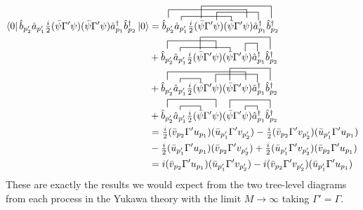 \documentclass[12pt]{article}
\newcommand{\bra}[1]{\left| #1 \right>}
\newcommand{\ket}[1]{\left| #1 \right>}
\renewcommand{\bra}[1]{\left< #1 \right|}
\renewcommand{\a}{\hat{a}}
\newcommand{\adag}{\hat{a}^\dagger}
\renewcommand{\b}{\hat{b}}
\newcommand{\bdag}{\hat{b}^\dagger}
\begin{document}
\begin{align*}
\bra{0} \b_{p_2'} \a_{p_1'} \tfrac{i}{2} ( \bar{\psi} \Gamma' \psi) (\bar{\psi} \Gamma' \psi)\adag_{p_1} \bdag_{p_2} \ket{0} 
& =
\contraction[2ex]{}{\b_{p_2'}}{ \a_{p_1'} \tfrac{i}{2} ( \bar{\psi} \Gamma' \psi) (\bar{\psi} \Gamma'}{ \psi}
\contraction{\b_{p_2'} }{ \a_{p_1'} }{ \tfrac{i}{2} ( \bar{\psi} \Gamma' \psi) (} {\bar{\psi}} 
\contraction[2ex]{\b_{p_2'} \a_{p_1'} \tfrac{i}{2} ( \bar{\psi} \Gamma'}{ \psi}{) (\bar{\psi} \Gamma' \psi)}{\adag}
\contraction[3ex]{\b_{p_2'} \a_{p_1'} \tfrac{i}{2} ( }{ \bar{\psi} }{ \Gamma' \psi) ( \bar{\psi}  \Gamma' \psi )\adag_{p_1} }{ \bdag}
\b_{p_2'} \a_{p_1'} \tfrac{i}{2} ( \bar{\psi} \Gamma' \psi) (\bar{\psi} \Gamma' \psi)\adag_{p_1} \bdag_{p_2}
\\
& +  
\contraction[2ex]{}{\b_{p_2'}}{ \a_{p_1'} \tfrac{i}{2} ( \bar{\psi} \Gamma'}{ \psi}
\contraction{\b_{p_2'} }{ \a_{p_1'} }{ \tfrac{i}{2} ( \bar{\psi} \Gamma' \psi) (} {\bar{\psi}} 
\contraction[2ex]{\b_{p_2'} \a_{p_1'} \tfrac{i}{2} ( \bar{\psi} \Gamma' \psi) (\bar{\psi} \Gamma'}{ \psi}{)}{\adag}
\contraction[3ex]{\b_{p_2'} \a_{p_1'} \tfrac{i}{2} ( }{ \bar{\psi} }{ \Gamma' \psi) ( \bar{\psi}  \Gamma' \psi )\adag_{p_1} }{ \bdag}
\b_{p_2'} \a_{p_1'} \tfrac{i}{2} ( \bar{\psi} \Gamma' \psi) (\bar{\psi} \Gamma' \psi)\adag_{p_1} \bdag_{p_2}
\\
& + 
\contraction[2ex]{}{\b_{p_2'}}{ \a_{p_1'} \tfrac{i}{2} ( \bar{\psi} \Gamma' \psi) (\bar{\psi} \Gamma'}{ \psi}
\contraction{\b_{p_2'} }{ \a_{p_1'} }{ \tfrac{i}{2} (}{ \bar{\psi} } 
\contraction[2ex]{\b_{p_2'} \a_{p_1'} \tfrac{i}{2} ( \bar{\psi} \Gamma'}{ \psi}{) (\bar{\psi} \Gamma' \psi)}{\adag}
\contraction[3ex]{\b_{p_2'} \a_{p_1'} \tfrac{i}{2} ( \bar{\psi} \Gamma' \psi) (}{ \bar{\psi} }{ \Gamma' \psi )\adag_{p_1} }{ \bdag}
\b_{p_2'} \a_{p_1'} \tfrac{i}{2} ( \bar{\psi} \Gamma' \psi) (\bar{\psi} \Gamma' \psi)\adag_{p_1} \bdag_{p_2}
\\
& +  
\contraction[2ex]{}{\b_{p_2'}}{ \a_{p_1'} \tfrac{i}{2} ( \bar{\psi} \Gamma'}{ \psi}
\contraction{\b_{p_2'} }{ \a_{p_1'} }{ \tfrac{i}{2} (}{ \bar{\psi} } 
\contraction{\b_{p_2'} \a_{p_1'} \tfrac{i}{2} ( \bar{\psi} \Gamma' \psi) (\bar{\psi} \Gamma'}{ \psi}{)}{\adag}
\contraction[2ex]{\b_{p_2'} \a_{p_1'} \tfrac{i}{2} ( \bar{\psi} \Gamma' \psi) (}{ \bar{\psi} }{ \Gamma' \psi )\adag_{p_1} }{ \bdag}
\b_{p_2'} \a_{p_1'} \tfrac{i}{2} ( \bar{\psi} \Gamma' \psi) (\bar{\psi} \Gamma' \psi)\adag_{p_1} \bdag_{p_2}
\\
& = \tfrac{i}{2} ( \bar{v}_{p_2} \Gamma' u_{p_1}) (\bar{u}_{p_1'} \Gamma' v_{p_2'}) - \tfrac{i}{2} ( \bar{v}_{p_2} \Gamma' v_{p_2'}) (\bar{u}_{p_1'} \Gamma' u_{p_1})
\\
& - \tfrac{i}{2} ( \bar{u}_{p_1'} \Gamma' u_{p_1}) (\bar{v}_{p_2} \Gamma' v_{p_2'}) + \tfrac{i}{2} ( \bar{u}_{p_1'} \Gamma' v_{p_2'}) (\bar{v}_{p_2} \Gamma' u_{p_1})
\\
& = i ( \bar{v}_{p_2} \Gamma' u_{p_1}) (\bar{u}_{p_1'} \Gamma' v_{p_2'}) - i ( \bar{v}_{p_2} \Gamma' v_{p_2'}) (\bar{u}_{p_1'} \Gamma' u_{p_1})
\end{align*}
These are exactly the results we would expect from the two tree-level diagrams from each process in the Yukawa theory with the limit $M \to \infty$ taking $\Gamma' = \Gamma$.
\end{document}
